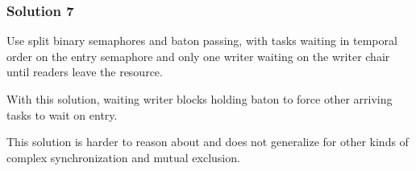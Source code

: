 \documentclass[11pt]{article}
\begin{document}
\subsubsection{Solution 7}
\label{sec:org56a0199}
Use split binary semaphores and baton passing, with tasks waiting in temporal order on
the entry semaphore and only one writer waiting on the writer chair until readers leave
the resource.

With this solution, waiting writer blocks holding baton to force other arriving tasks to
wait on entry.

This solution is harder to reason about and does not generalize for other kinds of complex
synchronization and mutual exclusion.
\end{document}
